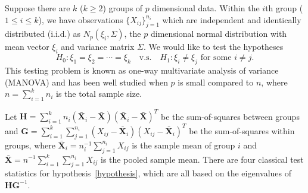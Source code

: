 \documentclass[12pt]{article} %
\renewcommand{\theequation}{\thesection\arabic{equation}}
\DeclareMathOperator{\mytr}{tr}
\newcommand{\bX}{\mathbf{X}}
\newcommand{\bH}{\mathbf{H}}
\newcommand{\bG}{\mathbf{G}}
\theoremstyle{definition}
\begin{document}
\def\thefigure{\arabic{figure}}
\def\thetable{\arabic{table}}

\renewcommand{\theequation}{\thesection.\arabic{equation}}


\fontsize{12}{14pt plus.8pt minus .6pt}\selectfont

\setcounter{section}{1} %
\setcounter{equation}{0} %
Suppose there are $k$ ($k\geq 2$) groups of $p$ dimensional data.
Within the $i$th group ($1\leq i\leq k$), we have observations $\{X_{ij}\}_{j=1}^{n_i}$ which are independent and identically distributed (i.i.d.) as $N_p(\xi_i,\Sigma)$, the $p$ dimensional normal distribution with mean vector $\xi_i$ and variance matrix $\Sigma$.
We would like to test the hypotheses
\begin{equation}\label{hypothesis}
    H_0: \xi_1=\xi_2=\cdots=\xi_k\quad \text{v.s.}\quad　H_1: \text{$\xi_i\neq \xi_j$ for some $i\neq j$}.
\end{equation}
This testing problem is known as one-way multivariate analysis of variance (MANOVA) and has been well studied when $p$ is small compared to $n$, where $n=\sum_{i=1}^k n_i$ is the total sample size.

Let $\bH=\sum_{i=1}^k n_i (\bar{\bX}_i-\bar{\bX})(\bar{\bX}_i-\bar{\bX})^T$ be the sum-of-squares between groups and $\bG=\sum_{i=1}^k \sum_{j=1}^{n_i}(X_{ij}-\bar{\bX}_i)(X_{ij}-\bar{\bX}_i)^T$ be the sum-of-squares within groups, where $\bar{\bX}_i=n_i^{-1}\sum_{j=1}^{n_i}X_{ij}$ is the sample mean of group $i$ and $\bar{\bX}=n^{-1}\sum_{i=1}^k\sum_{j=1}^{n_i}X_{ij}$ is the pooled sample mean.
   There are four classical test statistics for hypothesis~\eqref{hypothesis}, which are all based on the eigenvalues of $\bH\bG^{-1}$. 

\end{document}
